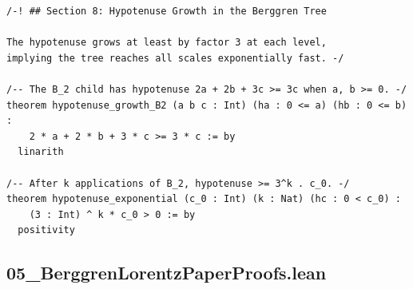 \documentclass[11pt,openright,twoside]{book}
\theoremstyle{definition}
\begin{document}
\begin{lstlisting}[style=lean]
/-! ## Section 8: Hypotenuse Growth in the Berggren Tree

The hypotenuse grows at least by factor 3 at each level,
implying the tree reaches all scales exponentially fast. -/

/-- The B_2 child has hypotenuse 2a + 2b + 3c >= 3c when a, b >= 0. -/
theorem hypotenuse_growth_B2 (a b c : Int) (ha : 0 <= a) (hb : 0 <= b) :
    2 * a + 2 * b + 3 * c >= 3 * c := by
  linarith

/-- After k applications of B_2, hypotenuse >= 3^k . c_0. -/
theorem hypotenuse_exponential (c_0 : Int) (k : Nat) (hc : 0 < c_0) :
    (3 : Int) ^ k * c_0 > 0 := by
  positivity

\end{lstlisting}

\clearpage


\subsection*{05\_BerggrenLorentzPaperProofs.lean}
\label{lean:05_BerggrenLorentzPaperProofs}
\end{document}
